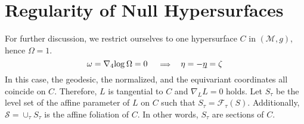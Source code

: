 \documentclass[12pt, a4paper]{report}
\theoremstyle{bfnote}
\newcommand{\underit}[1]{\textit{\underbar{#1}}}
\begin{document}
\section{Regularity of Null Hypersurfaces}
For further discussion, we restrict ourselves to one hypersurface $C$ in
$\left(\mathcal{M}, g\right)$, hence $\Omega = 1$.
\begin{equation*}
    \omega = \nabla_4\mathrm{log}\hspace{0.2em}\Omega = 0\; \quad \scalebox{0.8}{$\implies$} \quad \eta = -\underit{$\eta$} = \zeta
\end{equation*}
In this case, the geodesic, the normalized, and the equivariant coordinates all
coincide on $C$. Therefore, $L$ is tangential to $C$ and $\nabla_L L = 0$ holds.
Let $S_\tau$ be the level set of the affine parameter of $L$ on $C$ such that
$S_\tau = \mathcal{F}_\tau\left(S\right)$. Additionally, $\mathit{\mathcal{S}} =
\cup_\tau S_\tau$ is the affine foliation of $C$. In other words, $S_\tau$ are
sections of $C$.
\end{document}
